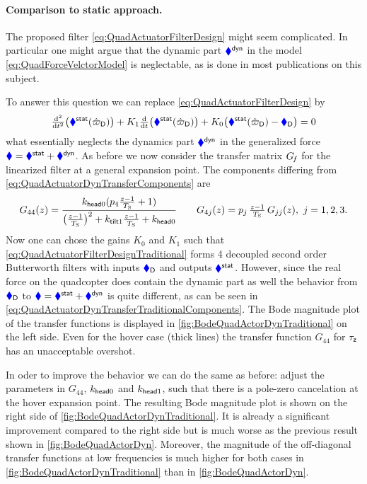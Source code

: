 \paragraph{Comparison to static approach.}
The proposed filter \eqref{eq:QuadActuatorFilterDesign} might seem complicated.
In particular one might argue that the dynamic part $\textcolor{blue}{\blacklozenge}^{\mathsf{dyn}}$ in the model \eqref{eq:QuadForceVelctorModel} is neglectable, as is done in most publications on this subject.

To answer this question we can replace \eqref{eq:QuadActuatorFilterDesign} by
\begin{align}\label{eq:QuadActuatorFilterDesignTraditional}
 \tfrac{\mathrm{d}^2}{\mathrm{d} t^2} \big(\textcolor{blue}{\blacklozenge}^{\mathsf{stat}}(\hat{\varpi}_{\mathsf{D}})\big) + K_1 \tfrac{\mathrm{d}}{\mathrm{d} t} \big(\textcolor{blue}{\blacklozenge}^{\mathsf{stat}}(\hat{\varpi}_{\mathsf{D}})\big) + K_0 \big( \textcolor{blue}{\blacklozenge}^{\mathsf{stat}}(\hat{\varpi}_{\mathsf{D}}) - \textcolor{blue}{\blacklozenge}_{\mathsf{D}} \big) = 0
\end{align}
what essentially neglects the dynamics part $\textcolor{blue}{\blacklozenge}^{\mathsf{dyn}}$ in the generalized force $\textcolor{blue}{\blacklozenge} = \textcolor{blue}{\blacklozenge}^{\mathsf{stat}} + \textcolor{blue}{\blacklozenge}^{\mathsf{dyn}}$.
As before we now consider the transfer matrix $G_{\hspace{-0.3ex}f}$ for the linearized filter at a general expansion point.
The components differing from \eqref{eq:QuadActuatorDynTransferComponents} are
\begin{align}\label{eq:QuadActuatorDynTransferTraditionalComponents}
 G_{44}(z) = \frac{k_{\mathsf{head}0}(p_4\tfrac{z-1}{T_{\mathrm{S}}} + 1)}{\big(\tfrac{z-1}{T_{\mathrm{S}}}\big)^2 + k_{\mathsf{tilt}1} \tfrac{z-1}{T_{\mathrm{S}}} + k_{\mathsf{head}0}}
\qquad
 G_{4j}(z) = p_j\,\tfrac{z-1}{T_{\mathrm{S}}}\,G_{jj}(z), \ j=1,2,3.
\end{align}
Now one can chose the gains $K_0$ and $K_1$ such that \eqref{eq:QuadActuatorFilterDesignTraditional} forms 4 decoupled second order Butterworth filters with inputs $\textcolor{blue}{\blacklozenge}_{\mathsf{D}}$ and outputs $\textcolor{blue}{\blacklozenge}^{\mathsf{stat}}$.
However, since the real force on the quadcopter does contain the dynamic part as well the behavior from $\textcolor{blue}{\blacklozenge}_{\mathsf{D}}$ to $\textcolor{blue}{\blacklozenge} = \textcolor{blue}{\blacklozenge}^{\mathsf{stat}} + \textcolor{blue}{\blacklozenge}^{\mathsf{dyn}}$ is quite different, as can be seen in \eqref{eq:QuadActuatorDynTransferTraditionalComponents}.
The Bode magnitude plot of the transfer functions is displayed in \autoref{fig:BodeQuadActorDynTraditional} on the left side.
Even for the hover case (thick lines) the transfer function $G_{44}$ for $\tau_{\mathsf{z}}$ has an unacceptable overshot.

In oder to improve the behavior we can do the same as before: adjust the parameters in $G_{44}$, \ie $k_{\mathsf{head}0}$ and $k_{\mathsf{head}1}$, such that there is a pole-zero cancelation at the hover expansion point.
The resulting Bode magnitude plot is shown on the right side of \autoref{fig:BodeQuadActorDynTraditional}.
It is already a significant improvement compared to the right side but is much worse as the previous result shown in \autoref{fig:BodeQuadActorDyn}.
Moreover, the magnitude of the off-diagonal transfer functions at low frequencies is much higher for both cases in \autoref{fig:BodeQuadActorDynTraditional} than in \autoref{fig:BodeQuadActorDyn}.

